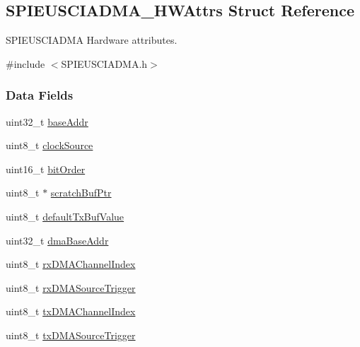 \subsection{S\+P\+I\+E\+U\+S\+C\+I\+A\+D\+M\+A\+\_\+\+H\+W\+Attrs Struct Reference}
\label{struct_s_p_i_e_u_s_c_i_a_d_m_a___h_w_attrs}


S\+P\+I\+E\+U\+S\+C\+I\+A\+D\+M\+A Hardware attributes.  




{\ttfamily \#include $<$S\+P\+I\+E\+U\+S\+C\+I\+A\+D\+M\+A.\+h$>$}

\subsubsection*{Data Fields}
\begin{DoxyCompactItemize}
\item 
uint32\+\_\+t \hyperlink{struct_s_p_i_e_u_s_c_i_a_d_m_a___h_w_attrs_a2d0c61d4d3b6d0bc7be6c8099777218b}{base\+Addr}
\item 
uint8\+\_\+t \hyperlink{struct_s_p_i_e_u_s_c_i_a_d_m_a___h_w_attrs_a55287dc23a355a59426281488f93751c}{clock\+Source}
\item 
uint16\+\_\+t \hyperlink{struct_s_p_i_e_u_s_c_i_a_d_m_a___h_w_attrs_a334de16b0d88008d2a2861c7fbfd12c9}{bit\+Order}
\item 
uint8\+\_\+t $\ast$ \hyperlink{struct_s_p_i_e_u_s_c_i_a_d_m_a___h_w_attrs_a7dbf1b486afe617017a67f00deb66c7f}{scratch\+Buf\+Ptr}
\item 
uint8\+\_\+t \hyperlink{struct_s_p_i_e_u_s_c_i_a_d_m_a___h_w_attrs_af8f32ede102305173f56ad61394af36b}{default\+Tx\+Buf\+Value}
\item 
uint32\+\_\+t \hyperlink{struct_s_p_i_e_u_s_c_i_a_d_m_a___h_w_attrs_a6a3751b0693770600e990c1db9980da4}{dma\+Base\+Addr}
\item 
uint8\+\_\+t \hyperlink{struct_s_p_i_e_u_s_c_i_a_d_m_a___h_w_attrs_a7d9c5ce7284e01f13535ffb1aaacd039}{rx\+D\+M\+A\+Channel\+Index}
\item 
uint8\+\_\+t \hyperlink{struct_s_p_i_e_u_s_c_i_a_d_m_a___h_w_attrs_ac6ae7a900452d8f24381f26e2b8a2e1b}{rx\+D\+M\+A\+Source\+Trigger}
\item 
uint8\+\_\+t \hyperlink{struct_s_p_i_e_u_s_c_i_a_d_m_a___h_w_attrs_ae0154552cc397e1b4d99a490bc9676e1}{tx\+D\+M\+A\+Channel\+Index}
\item 
uint8\+\_\+t \hyperlink{struct_s_p_i_e_u_s_c_i_a_d_m_a___h_w_attrs_a381d4d773f4c309e35eec9da42305037}{tx\+D\+M\+A\+Source\+Trigger}
\end{DoxyCompactItemize}


